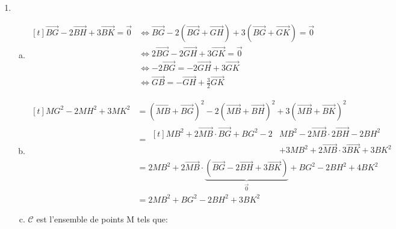 \documentclass[12pt, a4paper]{article}
\begin{document}
\begin{Exercise}[number={136}]
    \begin{enumerate}[1)]
        \item	\begin{enumerate}[a)]
                    \item	$\begin{aligned}[t]
                                \overrightarrow{BG}-2\overrightarrow{BH}+3\overrightarrow{BK}=\overrightarrow{0}&\iff\overrightarrow{BG}-2\left(\overrightarrow{BG}+\overrightarrow{GH}\right)+3\left(\overrightarrow{BG}+\overrightarrow{GK}\right)=\overrightarrow{0} &\\
                                &\iff 2\overrightarrow{BG}-2\overrightarrow{GH}+3\overrightarrow{GK}=\overrightarrow{0} &\\
                                &\iff -2\overrightarrow{BG}=-2\overrightarrow{GH}+3\overrightarrow{GK} &\\
                                &\iff\overrightarrow{GB}=-\overrightarrow{GH}+\tfrac{3}{2}\overrightarrow{GK}
                            \end{aligned}$
                    \item   $\begin{aligned}[t]
                                MG^2-2MH^2+3MK^2&=\left(\overrightarrow{MB}+\overrightarrow{BG}\right)^2-2\left(\overrightarrow{MB}+\overrightarrow{BH}\right)^2+3\left(\overrightarrow{MB}+\overrightarrow{BK}\right)^2 &\\
                                &=  \begin{aligned}[t]
                                        MB^2+2\overrightarrow{MB}\cdot\overrightarrow{BG}+BG^2-2&MB^2-2\overrightarrow{MB}\cdot 2\overrightarrow{BH}-2BH^2 \\
                                                                                                                              &+3MB^2+2\overrightarrow{MB}\cdot 3\overrightarrow{BK}+3BK^2
                                    \end{aligned} &\\
                                &= 2MB^2+2\overrightarrow{MB}\cdot\underbrace{\left(\overrightarrow{BG}-2\overrightarrow{BH}+3\overrightarrow{BK}\right)}_{\vec{0}}+BG^2-2BH^2+4BK^2 &\\
                                &=2MB^2+BG^2-2BH^2+3BK^2
                            \end{aligned}$
                    \item   $\mathcal{C}$ est l'ensemble de points M tels que: \medbreak

\end{enumerate}
\end{enumerate}
\end{Exercise}
\end{document}
